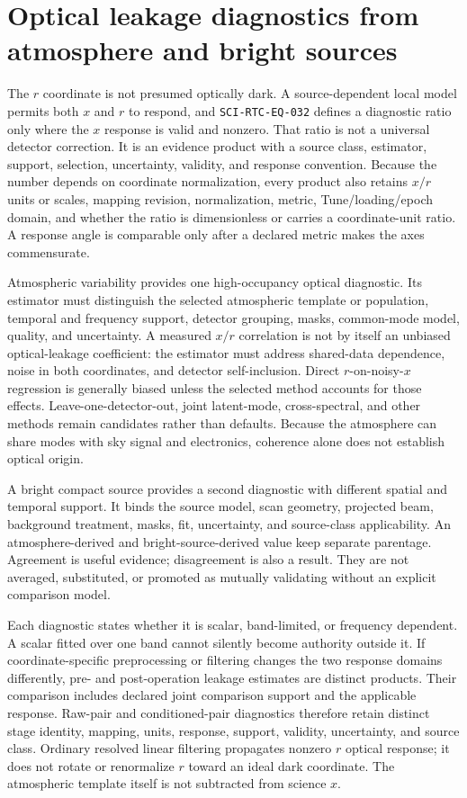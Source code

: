 \documentclass[10pt]{article}
\begin{document}
\section{Optical leakage diagnostics from atmosphere and bright sources}
\label{sec:rat-leakage}
The $r$ coordinate is not presumed optically dark.  A source-dependent local
model permits both $x$ and $r$ to respond, and \texttt{SCI-RTC-EQ-032}
defines a diagnostic ratio only where the $x$ response is valid and nonzero.
That ratio is not a universal detector correction.  It is an evidence product
with a source class, estimator, support, selection, uncertainty, validity,
and response convention.  Because the number depends on coordinate
normalization, every product also retains $x/r$ units or scales, mapping
revision, normalization, metric, Tune/loading/epoch domain, and whether the
ratio is dimensionless or carries a coordinate-unit ratio.  A response angle
is comparable only after a declared metric makes the axes commensurate.

Atmospheric variability provides one high-occupancy optical diagnostic.  Its
estimator must distinguish the selected atmospheric template or population,
temporal and frequency support, detector grouping, masks, common-mode model,
quality, and uncertainty.  A measured $x/r$ correlation is not by itself an
unbiased optical-leakage coefficient: the estimator must address shared-data
dependence, noise in both coordinates, and detector self-inclusion.  Direct
$r$-on-noisy-$x$ regression is generally biased unless the selected method
accounts for those effects.  Leave-one-detector-out, joint latent-mode,
cross-spectral, and other methods remain candidates rather than defaults.
Because the atmosphere can share modes with sky signal and electronics,
coherence alone does not establish optical origin.

A bright compact source provides a second diagnostic with different spatial
and temporal support.  It binds the source model, scan geometry, projected
beam, background treatment, masks, fit, uncertainty, and source-class
applicability.  An atmosphere-derived and bright-source-derived value keep
separate parentage.  Agreement is useful evidence; disagreement is also a
result.  They are not averaged, substituted, or promoted as mutually
validating without an explicit comparison model.

Each diagnostic states whether it is scalar, band-limited, or frequency
dependent.  A scalar fitted over one band cannot silently become authority
outside it.  If coordinate-specific preprocessing or filtering changes the
two response domains differently, pre- and post-operation leakage estimates
are distinct products.  Their comparison includes declared joint comparison
support and the
applicable response.  Raw-pair and conditioned-pair diagnostics therefore
retain distinct stage identity, mapping, units, response, support, validity,
uncertainty, and source class.  Ordinary resolved linear filtering propagates
nonzero $r$ optical response; it does not rotate or renormalize $r$ toward an
ideal dark coordinate.  The atmospheric template itself is not subtracted
from science $x$.
\end{document}
